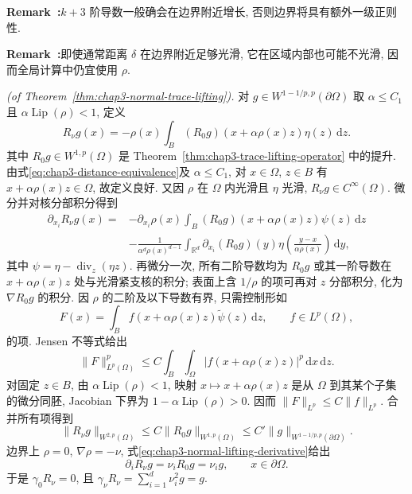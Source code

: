 \par\noindent{}\textbf{Remark~\thechapterthreesectionthreeremark:}\label{rem:chap3-regularized-distance-derivative-growth}\quad $k+3$ 阶导数一般确会在边界附近增长, 否则边界将具有额外一级正则性.

\par\noindent{}\textbf{Remark~\thechapterthreesectionthreeremark:}\label{rem:chap3-ordinary-distance-global-nonsmooth}\quad 即使通常距离 $\delta$ 在边界附近足够光滑, 它在区域内部也可能不光滑, 因而全局计算中仍宜使用 $\rho$.

\begin{Proof}
\textit{(of Theorem~\ref{thm:chap3-normal-trace-lifting}).}
对 $g\in W^{1-1/p,p}(\partial\Omega)$ 取 $\alpha\leq C_1$ 且 $\alpha\operatorname{Lip}(\rho)<1$, 定义
\[
 R_\nu g(x)=-\rho(x)\int_B(R_0g)(x+\alpha\rho(x)z)\eta(z)\,\mathrm dz.
\]
其中 $R_0g\in W^{1,p}(\Omega)$ 是 Theorem~\ref{thm:chap3-trace-lifting-operator} 中的提升. 由式\eqref{eq:chap3-distance-equivalence}及 $\alpha\leq C_1$, 对 $x\in\Omega$, $z\in B$ 有 $x+\alpha\rho(x)z\in\Omega$, 故定义良好. 又因 $\rho$ 在 $\Omega$ 内光滑且 $\eta$ 光滑, $R_\nu g\in C^\infty(\Omega)$. 微分并对核分部积分得到
\begin{equation}
 \begin{split}
 \partial_{x_i}R_\nu g(x)={}&-\partial_{x_i}\rho(x)
 \int_B(R_0g)(x+\alpha\rho(x)z)\psi(z)\,\mathrm dz\\
 &-\frac1{\alpha^d\rho(x)^{d-1}}
 \int_{\mathbb R^d}\partial_{x_i}(R_0g)(y)
 \eta\left(\frac{y-x}{\alpha\rho(x)}\right)\,\mathrm dy,
 \end{split}
 \label{eq:chap3-normal-lifting-derivative}
\end{equation}
其中 $\psi=\eta-\operatorname{div}_z(\eta z)$. 再微分一次, 所有二阶导数均为 $R_0g$ 或其一阶导数在 $x+\alpha\rho(x)z$ 处与光滑紧支核的积分; 表面上含 $1/\rho$ 的项可再对 $z$ 分部积分, 化为 $\nabla R_0g$ 的积分. 因 $\rho$ 的二阶及以下导数有界, 只需控制形如
\[
 F(x)=\int_Bf(x+\alpha\rho(x)z)\widetilde\psi(z)\,\mathrm dz,
 \qquad f\in L^p(\Omega),
\]
的项. Jensen 不等式给出
\[
 \|F\|_{L^p(\Omega)}^p
 \leq C\int_B\int_\Omega|f(x+\alpha\rho(x)z)|^p\,\mathrm dx\,\mathrm dz.
\]
对固定 $z\in B$, 由 $\alpha\operatorname{Lip}(\rho)<1$, 映射 $x\mapsto x+\alpha\rho(x)z$ 是从 $\Omega$ 到其某个子集的微分同胚, Jacobian 下界为 $1-\alpha\operatorname{Lip}(\rho)>0$. 因而 $\|F\|_{L^p}\leq C\|f\|_{L^p}$. 合并所有项得到
\[
 \|R_\nu g\|_{W^{2,p}(\Omega)}
 \leq C\|R_0g\|_{W^{1,p}(\Omega)}
 \leq C'\|g\|_{W^{1-1/p,p}(\partial\Omega)}.
\]
边界上 $\rho=0$, $\nabla\rho=-\nu$, 式\eqref{eq:chap3-normal-lifting-derivative}给出
\[
 \partial_iR_\nu g=\nu_iR_0g=\nu_i g,
 \qquad x\in\partial\Omega.
\]
于是 $\gamma_0R_\nu=0$, 且 $\gamma_\nu R_\nu=\sum_{i=1}^d\nu_i^2g=g$.
\end{Proof}

